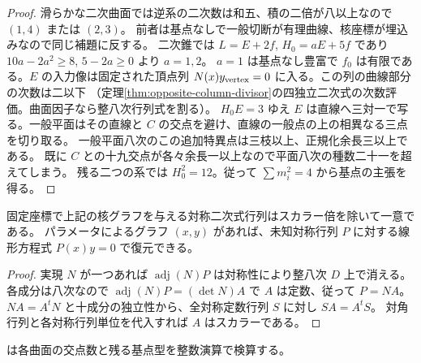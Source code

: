 \begin{proof}
滑らかな二次曲面では逆系の二次数は和五、積の二倍が八以上なので $(1,4)$ または $(2,3)$。
前者は基点なしで一般切断が有理曲線、核座標が埋込みなので同じ補題に反する。
二次錐では $L=E+2f$, $H_0=aE+5f$ であり $10a-2a^2\ge8$, $5-2a\ge0$ より $a=1,2$。
$a=1$ は基点なし豊富で $f_0$ は有限である。$E$ の入力像は固定された頂点列
$N(x)y_{\rm vertex}=0$ に入る。この列の曲線部分の次数は二以下
（定理\ref{thm:opposite-column-divisor}の四独立二次式の次数評価。曲面因子なら整八次行列式を割る）。
$H_0E=3$ ゆえ $E$ は直線へ三対一で写る。一般平面はその直線と
$C$ の交点を避け、直線の一般点の上の相異なる三点を切り取る。
一般平面八次のこの追加特異点は三枝以上、正規化余長三以上である。
既に $C$ との十九交点が各々余長一以上なので平面八次の種数二十一を超えてしまう。
残る二つの系では $H_0^2=12$。従って $\sum m_i^2=4$ から基点の主張を得る。
\end{proof}

\begin{lemma}\label{lem:symmetric-kernel-graph-reconstruction}
固定座標で上記の核グラフを与える対称二次式行列はスカラー倍を除いて一意である。
パラメータによるグラフ $(x,y)$ があれば、未知対称行列 $P$ に対する線形方程式 $P(x)y=0$ で復元できる。
\end{lemma}
\begin{proof}
実現 $N$ が一つあれば $\operatorname{adj}(N)P$ は対称性により整八次 $D$ 上で消える。
各成分は八次なので $\operatorname{adj}(N)P=(\det N)A$ で $A$ は定数、従って $P=NA$。
$NA=A^tN$ と十成分の独立性から、全対称定数行列 $S$ に対し $SA=A^tS$。
対角行列と各対称行列単位を代入すれば $A$ はスカラーである。
\end{proof}
 は各曲面の交点数と残る基点型を整数演算で検算する。
